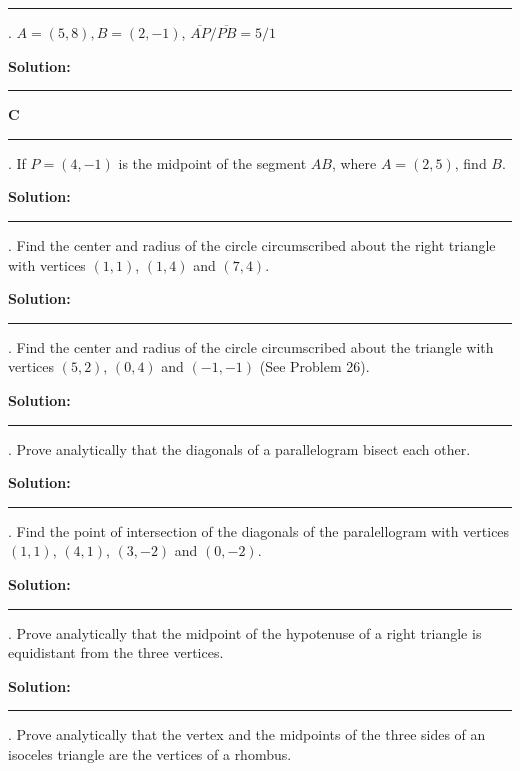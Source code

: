 \documentclass[10pt,letterpaper]{article}
\begin{document}
\noindent\rule{15cm}{0.4pt}

. $A=(5,8), B=(2,-1)$, $\overline{AP}/\overline{PB}=5/1$

\medskip
{} {\textbf{{\color{blue}Solution}:}}


\noindent\rule{15cm}{0.4pt}

\medskip
\textbf{C}
\medskip

\noindent\rule{15cm}{0.4pt}

. If $P=(4,-1)$ is the midpoint of the segment $AB$, where $A=(2,5)$, find $B$.

\medskip
{} {\textbf{{\color{blue}Solution}:}}

\noindent\rule{15cm}{0.4pt}

. Find the center and radius of the circle circumscribed about the right triangle with vertices $(1,1)$, $(1,4)$ and $(7,4)$.

\medskip
{} {\textbf{{\color{blue}Solution}:}}

\noindent\rule{15cm}{0.4pt}

. Find the center and radius of the circle circumscribed about the triangle with vertices $(5,2)$, $(0,4)$ and $(-1, -1)$ (See Problem 26).

\medskip
{} {\textbf{{\color{blue}Solution}:}}

\noindent\rule{15cm}{0.4pt}

. Prove analytically that the diagonals of a parallelogram bisect each other.

\medskip
{} {\textbf{{\color{blue}Solution}:}}

\noindent\rule{15cm}{0.4pt}

. Find the point of intersection of the diagonals of the paralellogram with vertices $(1,1)$, $(4,1)$, $(3,-2)$ and $(0,-2)$.

\medskip
{} {\textbf{{\color{blue}Solution}:}}

\noindent\rule{15cm}{0.4pt}

. Prove analytically that the midpoint of the hypotenuse of a right triangle is equidistant from the three vertices.

\medskip
{} {\textbf{{\color{blue}Solution}:}}

\noindent\rule{15cm}{0.4pt}

. Prove analytically that the vertex and the midpoints of the three sides of an isoceles triangle are the vertices of a rhombus.
\end{document}
